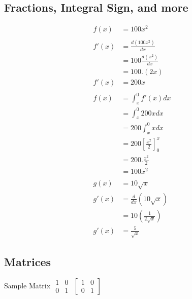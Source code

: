 \documentclass{article}
\begin{document}
\subsection{Fractions, Integral Sign, and more}
\allowdisplaybreaks %
\begin{align}
    f(x)  & = 100x^2                                    \\\nonumber\\
    f'(x) & =  \frac{d(100x^2)}{dx} \nonumber           \\
          & = 100\frac{d(x^2)}{dx}\nonumber             \\
          & =100.(2x)\nonumber                          \\
    f'(x) & =200x                                       \\\nonumber\\
    f(x)  & =\int^0_x f'(x)dx\nonumber                  \\
          & =\int^0_x 200x dx\nonumber                  \\
          & =200\int^0_x x dx\nonumber                  \\
          & =200\left[\frac{x^2}{2}\right]^x_0\nonumber \\
          & =200.\frac{x^2}{2}\nonumber                 \\
          & =100x^2                                     \\\nonumber\\
    g(x)  & =10\sqrt{x}                                 \\
    g'(x) & =\frac{d}{dx}  \left(10\sqrt{x}\right)\\
    &=   10 \left(\frac{1}{2\sqrt{x}}\right)   \\
    g'(x) & =\frac{5}{\sqrt{x}}
\end{align}

\subsection{Matrices}
Sample Matrix\newline
$\begin{matrix}
        1 & 0 \\
        0 & 1
    \end{matrix}$
$\left[\begin{matrix}
            1 & 0 \\
            0 & 1
        \end{matrix}\right]$
\end{document}

